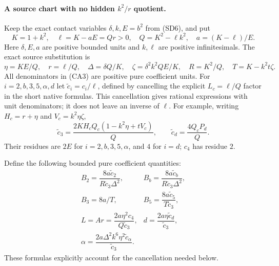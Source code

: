 \paragraph{A source chart with no hidden $k^2/r$ quotient.}
Keep the exact contact variables $\delta,k,E=b^2$ from (SD6), and put
\[
 K=1+k^2,\quad \ell=K-aE=Qr>0,\quad
 Q=K^2-\ell k^2,\quad a=(K-\ell)/E.
\]
Here $\delta,E,a$ are positive bounded units and $k,\ell$ are positive
infinitesimals. The exact source substitution is
\[
 \eta=KE/Q,\quad r=\ell/Q,\quad
 \Delta=\delta Q/K,\quad \zeta=\delta^2k^2QE/K,
 \quad R=K^2/Q,\quad T=K-k^2t\zeta.                    \tag{CA3}
\]
All denominators in (CA3) are positive pure coefficient units.
For $i=2,b,3,5,\alpha,d$ let $\widetilde c_i=c_i/\ell$,
defined by cancelling the explicit $L_c=\ell/Q$ factor in the short
native formulas. This cancellation gives rational expressions with
unit denominators; it does not leave an inverse of $\ell$.
For example, writing $H_c=r+\eta$ and $V_c=k^2\eta\zeta$,
\[
 \widetilde c_3=\frac{2KH_cQ_c(1-k^2\eta+tV_c)}Q,
 \qquad \widetilde c_d=\frac{4Q_cP_d}Q.
\]
Their residues are $2E$ for $i=2,b,3,5,\alpha$, and $4$ for $i=d$;
$c_4$ has residue $2$.

Define the following bounded pure coefficient quantities:
\[
 \begin{array}{ll}
 B_2=\dfrac{8a\widetilde c_2}{R\widetilde c_3\Delta^2},&
 B_b=\dfrac{8a\widetilde c_b}{R\widetilde c_3\Delta^2},\\[4pt]
 B_3=8a/T,&B_5=\dfrac{8a\widetilde c_5}{T\widetilde c_3},\\[4pt]
 L=Ar=\dfrac{2a\eta^2c_4}{Q\widetilde c_3},&
 d=\dfrac{2a\eta\widetilde c_d}{\widetilde c_3},\\[4pt]
 \alpha=\dfrac{2a\Delta^2k^6\eta^2\widetilde c_\alpha}
                    {\widetilde c_3}.&
 \end{array}                                                     \tag{CA4}
\]
These formulas explicitly account for the cancellation needed below.

